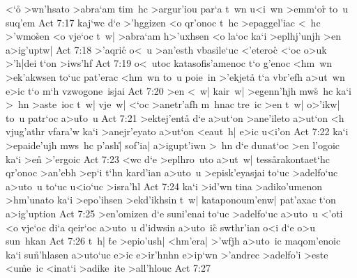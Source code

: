 <`o\r{}
>wn'hsato
>abra`am
tim~hc
>argur'iou
par`a
t~wn
u<i~wn
>emm`or\r{}
to~u
suq'em\bibvsend
\vs Act 7:17
kaj`wc
d`e
>'hggizen
<o
qr'onoc
t~hc
>epaggel'iac
<~hc
>'wmo\r{s}en
<o
vje`oc
t~w|
>abra`am
h>'uxhsen
<o
la`oc
ka`i
>eplhj'unjh
>en
a>ig'uptw|\bibvsend
\vs Act 7:18
>'aqri\r{c}
o<~u
>an'esth
vbasile`uc
<'etero\r{c}
<`oc
o>uk
>'h|dei
t`on
>iws'hf\bibvsend
\vs Act 7:19
o<~utoc
katasofis'amenoc
t`o
g'enoc
<hm~wn
>ek'akwsen
to`uc
pat'erac
<hm~wn
to~u
poie~in
>'ekjeta\r{}
t`a
vbr'efh
a>ut~wn
e>ic
t`o
m`h
vzwogone~isjai\bibvsend
\vs Act 7:20
>en
<~w|
kair~w|
>egenn'hjh
mw\r{s}~hc
ka`i
>~hn
>aste~ioc
t~w|
vje~w|
<`oc
>anetr'afh
m~hnac
tre~ic
>en
t~w|
o>'ikw|
to~u
patr`oc
a>u\r{t}o~u\bibvsend
{}
\vs Act 7:21
>ektej'enta\r{}
d`e
a>ut`on
>ane'ileto
a>ut`on
<h
vjug'athr
vfara'w
ka`i
>anejr'eyato
a>ut`on
<eaut~h|
e>ic
u<i'on\bibvsend
\vs Act 7:22
ka`i
>epaide'ujh
mws~hc
p'ash|\r{}
sof'ia|
a>igupt'iwn
>~hn
d`e
dunat`oc
>en
l'ogoic
ka`i
>en\r{}
>'ergoic\bibvsend
\vs Act 7:23
<wc
d`e
>eplhro~uto
a>ut~w|
tess\r{a}rakontaet`hc
qr'onoc
>an'ebh
>ep`i
t`hn
kard'ian
a>uto~u
>episk'eyasjai
to`uc
>adelfo`uc
a>uto~u
to`uc
u<io`uc
>isra'hl\bibvsend
\vs Act 7:24
ka`i
>id'wn
tina
>adiko'umenon
>hm'unato
ka`i
>epo'ihsen
>ekd'ikhsin
t~w|
kataponoum'enw|
pat'axac
t`on
a>ig'uption\bibvsend
\vs Act 7:25
>en'omizen
d`e
suni'enai
to`uc
>adelfo`uc
a>uto~u
<'oti
<o
vje`oc
di`a
qeir`oc
a>uto~u
d'idwsin
a>uto~ic\r{}
swthr'ian
o<i
d`e
o>u
sun~hkan\bibvsend
\vs Act 7:26
t~h|
\r{t}e
>epio'ush|
<hm'era|
>'wfjh
a>uto~ic
maqom'enoic
ka`i
su\r{n}'hlasen
a>uto`uc
e>ic
e>ir'hnhn
e>ip`wn
>'andrec
>adelfo'i
>este
<u\r{m}e~ic
<inat`i
>adike~ite
>all'hlouc\bibvsend
\vs Act 7:27
